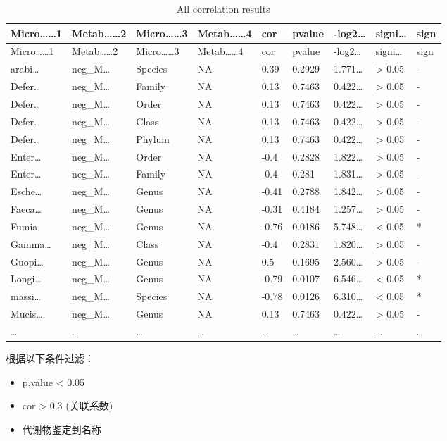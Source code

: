 \documentclass[
]{article}
\providecommand{\tightlist}{%
  \setlength{\itemsep}{0pt}\setlength{\parskip}{0pt}}
\begin{document}
\begin{longtable}[]{@{}lllllllll@{}}
\caption{\label{tab:all-correlation-results}All correlation results}\tabularnewline
\toprule
Micro\ldots\ldots1 & Metab\ldots\ldots2 & Micro\ldots\ldots3 & Metab\ldots\ldots4 & cor & pvalue & -log2\ldots{} & signi\ldots{} & sign\tabularnewline
\midrule
\endfirsthead
\toprule
Micro\ldots\ldots1 & Metab\ldots\ldots2 & Micro\ldots\ldots3 & Metab\ldots\ldots4 & cor & pvalue & -log2\ldots{} & signi\ldots{} & sign\tabularnewline
\midrule
\endhead
arabi\ldots{} & neg\_M\ldots{} & Species & NA & 0.39 & 0.2929 & 1.771\ldots{} & \textgreater{} 0.05 & -\tabularnewline
Defer\ldots{} & neg\_M\ldots{} & Family & NA & 0.13 & 0.7463 & 0.422\ldots{} & \textgreater{} 0.05 & -\tabularnewline
Defer\ldots{} & neg\_M\ldots{} & Order & NA & 0.13 & 0.7463 & 0.422\ldots{} & \textgreater{} 0.05 & -\tabularnewline
Defer\ldots{} & neg\_M\ldots{} & Class & NA & 0.13 & 0.7463 & 0.422\ldots{} & \textgreater{} 0.05 & -\tabularnewline
Defer\ldots{} & neg\_M\ldots{} & Phylum & NA & 0.13 & 0.7463 & 0.422\ldots{} & \textgreater{} 0.05 & -\tabularnewline
Enter\ldots{} & neg\_M\ldots{} & Order & NA & -0.4 & 0.2828 & 1.822\ldots{} & \textgreater{} 0.05 & -\tabularnewline
Enter\ldots{} & neg\_M\ldots{} & Family & NA & -0.4 & 0.281 & 1.831\ldots{} & \textgreater{} 0.05 & -\tabularnewline
Esche\ldots{} & neg\_M\ldots{} & Genus & NA & -0.41 & 0.2788 & 1.842\ldots{} & \textgreater{} 0.05 & -\tabularnewline
Faeca\ldots{} & neg\_M\ldots{} & Genus & NA & -0.31 & 0.4184 & 1.257\ldots{} & \textgreater{} 0.05 & -\tabularnewline
Fumia & neg\_M\ldots{} & Genus & NA & -0.76 & 0.0186 & 5.748\ldots{} & \textless{} 0.05 & *\tabularnewline
Gamma\ldots{} & neg\_M\ldots{} & Class & NA & -0.4 & 0.2831 & 1.820\ldots{} & \textgreater{} 0.05 & -\tabularnewline
Guopi\ldots{} & neg\_M\ldots{} & Genus & NA & 0.5 & 0.1695 & 2.560\ldots{} & \textgreater{} 0.05 & -\tabularnewline
Longi\ldots{} & neg\_M\ldots{} & Genus & NA & -0.79 & 0.0107 & 6.546\ldots{} & \textless{} 0.05 & *\tabularnewline
massi\ldots{} & neg\_M\ldots{} & Species & NA & -0.78 & 0.0126 & 6.310\ldots{} & \textless{} 0.05 & *\tabularnewline
Mucis\ldots{} & neg\_M\ldots{} & Genus & NA & 0.13 & 0.7463 & 0.422\ldots{} & \textgreater{} 0.05 & -\tabularnewline
\ldots{} & \ldots{} & \ldots{} & \ldots{} & \ldots{} & \ldots{} & \ldots{} & \ldots{} & \ldots{}\tabularnewline
\bottomrule
\end{longtable}

根据以下条件过滤：

\begin{itemize}
\tightlist
\item
  p.value \textless{} 0.05
\item
  cor \textgreater{} 0.3 (关联系数)
\item
  代谢物鉴定到名称
\end{itemize}
\end{document}
